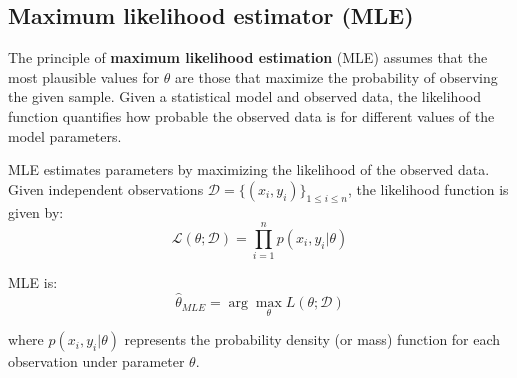 \documentclass[12pt, a4paper]{article}
\theoremstyle{definition}
\numberwithin{figure}{section}
\numberwithin{equation}{section}
\numberwithin{table}{section}
\begin{document}
\subsection{Maximum likelihood estimator (MLE)}
The principle of \textbf{maximum likelihood estimation} (MLE) assumes that the most plausible values for $\theta$ are those that maximize the probability of observing the given sample. Given a statistical model and observed data, the likelihood function quantifies how probable the observed data is for different values of the model parameters.

MLE estimates parameters by maximizing the likelihood of the observed data.
Given independent observations $\mathcal{D} = \{(x_i, y_i)\}_{1 \leq i \leq n}$, the likelihood function is given by:
\begin{equation}
\mathcal{L}(\theta; \mathcal{D}) = \prod\limits_{i=1}^n p(x_i, y_i | \theta)
\end{equation}

MLE is:
\begin{equation}
\hat{\theta}_{MLE} = \arg\max\limits_{\theta} L(\theta; \mathcal{D})
\end{equation}

where $p(x_i, y_i | \theta)$ represents the probability density (or mass) function for each observation under parameter $\theta$.
\end{document}
